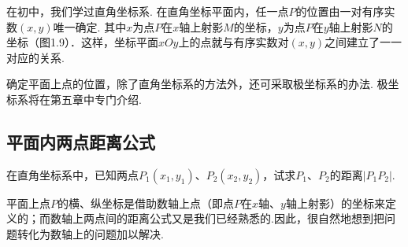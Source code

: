 \noindent
\begin{minipage}{.65\textwidth}
    \CTEXindent
在初中，我们学过直角坐标系. 在直角坐标平面内，任一点$P$的位置由一对有序实数$(x,y)$唯一确定. 其中$x$为点$P$在$x$轴上射影$M$的坐标，$y$为点$P$在$y$轴上射影$N$的坐标（图1.9）．这样，坐标平面$xOy$上的点就与有序实数对$(x,y)$之间建立了一一对应的关系.    
\end{minipage}\hfill
\begin{minipage}{.32\textwidth}
\centering
{}
\end{minipage}

确定平面上点的位置，除了直角坐标系的方法外，还可采取极坐标系的办法. 极坐标系将在第五章中专门介绍.


\subsection{平面内两点距离公式}

在直角坐标系中，已知两点$P_1(x_1,y_1)$、$P_2(x_2,y_2)$，试求$P_1$、$P_2$的距离$|P_1P_2|$.

\begin{analyze}
    平面上点$P$的横、纵坐标是借助数轴上点（即点$P$在$x$轴、$y$轴上射影）的坐标来定义的；而数轴上两点间的距离公式又是我们已经熟悉的.因此，很自然地想到把问题转化为数轴上的问题加以解决.
\end{analyze}

